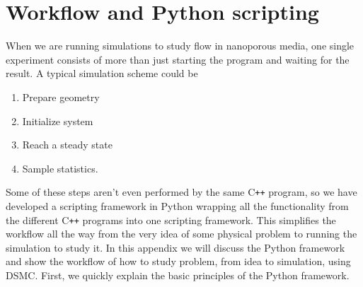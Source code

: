 \chapter{Workflow and Python scripting}
When we are running simulations to study flow in nanoporous media, one single experiment consists of more than just starting the program and waiting for the result. A typical simulation scheme could be
\begin{enumerate}
	\item Prepare geometry
	\item Initialize system
	\item Reach a steady state
	\item Sample statistics.
\end{enumerate}
Some of these steps aren't even performed by the same C{}\verb!++! program, so we have developed a scripting framework in Python wrapping all the functionality from the different C{}\verb!++! programs into one scripting framework. This simplifies the workflow all the way from the very idea of some physical problem to running the simulation to study it. In this appendix we will discuss the Python framework and show the workflow of how to study problem, from idea to simulation, using DSMC. First, we quickly explain the basic principles of the Python framework.

